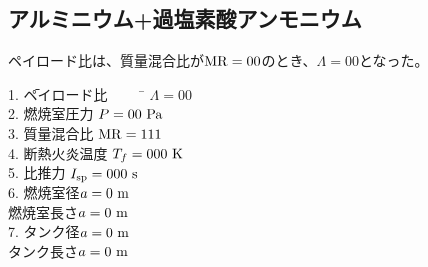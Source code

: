 \documentclass{jsarticle}
\begin{document}
\subsection{アルミニウム+過塩素酸アンモニウム}
ペイロード比は、質量混合比が$\rm{MR}=00$のとき、$\Lambda = 00$となった。
\begin{tabbing} 
1. \=ペイロード比 ~~~~ \= $\Lambda = 00$\\

2. \>燃焼室圧力 \> $P = 00 ~\rm{Pa}$\\

3. \>質量混合比 \>$\rm{MR}=111$\\

4. \>断熱火炎温度 \>$T_f = 000 ~ \rm{K}$\\

5. \>比推力 \>$I_{\rm{sp}}= 000 ~\rm{s}$\\

6. \>燃焼室径\>$a = 0 ~ \rm{m}$\\

\>燃焼室長さ\>$a = 0 ~ \rm{m}$\\

7. \>タンク径\>$a = 0 ~ \rm{m}$\\

\>タンク長さ\>$a = 0 ~ \rm{m}$\\
\end{tabbing} 
\end{document}

